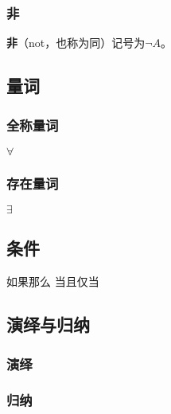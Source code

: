 \subsubsection{非}
\textbf{非}（not，也称为同）记号为$\lnot A$。

\subsection{量词}

\subsubsection{全称量词}

$\forall$

\subsubsection{存在量词}

$\exists$

\subsection{条件}
如果那么 当且仅当
\subsection{演绎与归纳}

\subsubsection{演绎}

\subsubsection{归纳}